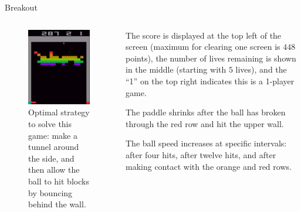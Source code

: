 \documentclass[10pt, aspectratio=169, compress, protectframetitle, handout]{beamer}
\begin{document}
\begin{frame}{Breakout}

        \begin{columns}[onlytextwidth]
        \begin{column}{.4\textwidth}
            \begin{figure}
                \centering
                \includegraphics[width=3.8cm]{figures/poster2}
                \caption{Optimal strategy to solve this game: make a tunnel around the side, and then allow the ball to hit blocks by bouncing behind the wall.}
            \end{figure}
        \end{column}
        \begin{column}{.55\textwidth}
        
            The score is displayed at the top left of the screen (maximum for clearing one screen is $448$ points), the number of lives remaining is shown in the middle (starting with $5$ lives), and the ``1'' on the top right indicates this is a 1-player game.
            \medskip
            
            The paddle shrinks after the ball has broken through the red row and hit the upper wall.
            \medskip
            
            The ball speed increases at specific intervals: after four hits, after twelve hits, and after making contact with the orange and red rows.
        \end{column}
    \end{columns}
    
\end{frame}
\end{document}
